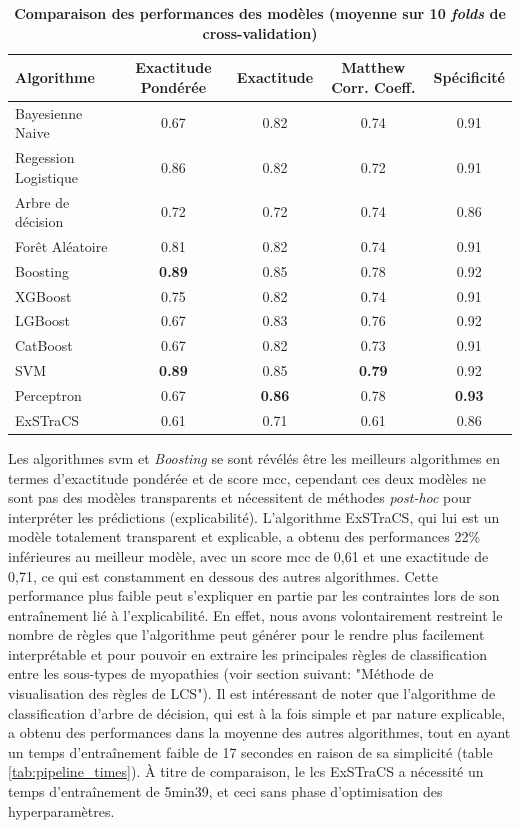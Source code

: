 \begin{table}[!ht]
\centering
\begin{tabular}{lcccc}
\hline
Algorithme & Exactitude Pondérée & Exactitude & Matthew Corr. Coeff. & Spécificité  \\
\hline
Bayesienne Naive & 0.67 & 0.82 & 0.74 & 0.91 \\
Regession Logistique & 0.86 & 0.82 & 0.72 & 0.91 \\
Arbre de décision & 0.72 & 0.72 & 0.74 & 0.86 \\
Forêt Aléatoire & 0.81 & 0.82 & 0.74 & 0.91 \\
Boosting & \textbf{0.89} & 0.85 & 0.78 & 0.92 \\
XGBoost & 0.75 & 0.82 & 0.74 & 0.91 \\
LGBoost & 0.67 & 0.83 & 0.76 & 0.92 \\
CatBoost & 0.67 & 0.82 & 0.73 & 0.91 \\
SVM & \textbf{0.89} & 0.85 & \textbf{0.79} & 0.92 \\
Perceptron & 0.67 & \textbf{0.86} & 0.78 & \textbf{0.93}\\
ExSTraCS & 0.61 & 0.71 & 0.61 & 0.86 \\
\hline
\end{tabular}
\caption[Comparaison des performances des modèles (moyenne sur 10 folds de cross-validation)]{\textbf{Comparaison des performances des modèles (moyenne sur 10 \textit{folds} de cross-validation)}}
\label{table:ml_metrics}
\end{table}        
Les algorithmes \gls{svm} et \textit{Boosting } se sont révélés être les meilleurs algorithmes en termes d'exactitude pondérée et de score \gls{mcc}, cependant ces deux modèles ne sont pas des modèles transparents et nécessitent de méthodes \textit{post-hoc} pour interpréter les prédictions (explicabilité). L'algorithme ExSTraCS, qui lui est un modèle totalement transparent et explicable, a obtenu des performances 22\% inférieures au meilleur modèle, avec un score \gls{mcc} de 0,61 et une exactitude de 0,71, ce qui est constamment en dessous des autres algorithmes. Cette performance plus faible peut s'expliquer en partie par les contraintes lors de son entraînement lié à l'explicabilité. En effet, nous avons volontairement restreint le nombre de règles que l'algorithme peut générer pour le rendre plus facilement interprétable et pour pouvoir en extraire les principales règles de classification entre les sous-types de myopathies (voir section suivant: "Méthode de visualisation des règles de LCS"). Il est intéressant de noter que l'algorithme de classification d'arbre de décision, qui est à la fois simple et par nature explicable, a obtenu des performances dans la moyenne des autres algorithmes, tout en ayant un temps d'entraînement faible de 17 secondes en raison de sa simplicité (table \ref{tab:pipeline_times}). À titre de comparaison, le \gls{lcs} ExSTraCS a nécessité un temps d'entraînement de 5min39, et ceci sans phase d'optimisation des hyperparamètres.
